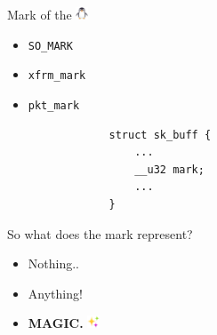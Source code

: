 \documentclass[black,white,aspectratio=169]{beamer}
\newcommand\blfootnote[1]{%
  \begingroup
  \renewcommand\thefootnote{}\footnote{#1}%
  \addtocounter{footnote}{-1}%
  \endgroup
}
\DeclareRobustCommand{\#}{\adjustbox{valign=B,totalheight=.57\baselineskip}{\oldhash}}%
\begin{document}
\begin{frame}[fragile]{Mark of the \includegraphics[height=1em]{penguin.png}}
\begin{table}
\begin{subtable}[l]{0.2\textwidth}
\begin{itemize}
                    \item \verb+SO_MARK+\medskip
                    \item \verb+xfrm_mark+\medskip
                    \item \verb+pkt_mark+
                \end{itemize}
            \end{subtable}
            \begin{subtable}[r]{0.7\textwidth}
                \begin{lstlisting}
                struct sk_buff {
                    ...
                    __u32 mark;
                    ...
                }
                \end{lstlisting}
            \end{subtable}
        \end{table}
    \end{frame}

    \begin{frame}{So what does the mark represent?}
        \begin{itemize}
            \item Nothing.. \bigskip
            \pause
            \item Anything! \bigskip
            \pause
            \item \textbf{MAGIC.} \includegraphics[height=1em]{sparkles.png}\bigskip
        \end{itemize}
    \end{frame}
\end{document}
